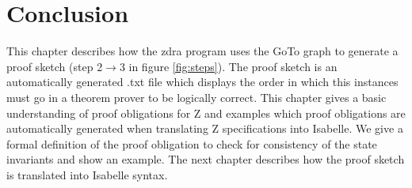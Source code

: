 \section{Conclusion}
\label{sec:skeletonsConclusion}

This chapter describes how the \gls{zdra} program uses the GoTo graph to
generate a proof sketch (step 2$\rightarrow$3 in figure
\ref{fig:steps}). The proof sketch is an automatically generated .txt
file which displays the order in which this instances must go in a theorem
prover to be logically correct. This chapter gives a basic understanding of
proof obligations for Z and examples which proof obligations are automatically
generated when translating Z specifications into Isabelle. We give a formal
definition of the proof obligation to check for consistency of the state
invariants and show an example. The next chapter describes how the proof
sketch is translated into Isabelle syntax.
